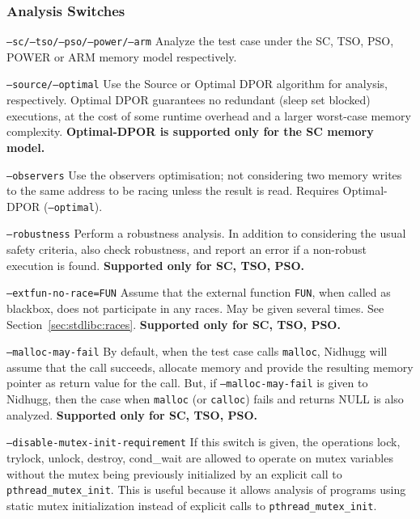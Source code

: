 \documentclass[a4paper]{article}
\newcommand{\limitsupport}[1]{\textbf{Supported only for #1.}}
\begin{document}
\subsubsection{Analysis Switches}\label{sec:analysis:switches}

\begin{description}
\item{\texttt{--sc/--tso/--pso/--power/--arm}}
%
  Analyze the test case under the SC, TSO, PSO, POWER or ARM memory
  model respectively.
\item{\texttt{--source/--optimal}}
%
  Use the Source or Optimal DPOR algorithm for analysis, respectively.
  Optimal DPOR guarantees no redundant (sleep set blocked) executions,
  at the cost of some runtime overhead and a larger worst-case memory
  complexity.
%
  \textbf{Optimal-DPOR is supported only for the SC memory model.}
\item{\texttt{--observers}}
%
  Use the observers optimisation; not considering two memory writes to
  the same address to be racing unless the result is read.
%
  Requires Optimal-DPOR (\texttt{--optimal}).
\item{\texttt{--robustness}}
%
  Perform a robustness analysis. In addition to considering the usual
  safety criteria, also check robustness, and report an error if a
  non-robust execution is found.
%
  \limitsupport{SC, TSO, PSO}
\item{\texttt{--extfun-no-race=FUN}}
%
  Assume that the external function \texttt{FUN}, when called as
  blackbox, does not participate in any races. May be given several
  times. See Section~\ref{sec:stdlibc:races}.
%
  \limitsupport{SC, TSO, PSO}
\item{\texttt{--malloc-may-fail}}
%
  By default, when the test case calls \texttt{malloc}, Nidhugg will
  assume that the call succeeds, allocate memory and provide the
  resulting memory pointer as return value for the call. But, if
  \texttt{--malloc-may-fail} is given to Nidhugg, then the case when
  \texttt{malloc} (or \texttt{calloc}) fails and returns NULL is also
  analyzed.
%
  \limitsupport{SC, TSO, PSO}
\item{\texttt{--disable-mutex-init-requirement}}
%
  If this switch is given, the operations lock, trylock, unlock,
  destroy, cond\_wait are allowed to operate on mutex variables
  without the mutex being previously initialized by an explicit call
  to \texttt{pthread\_mutex\_init}. This is useful because it allows
  analysis of programs using static mutex initialization instead of
  explicit calls to \texttt{pthread\_mutex\_init}.

\end{description}
\end{document}
